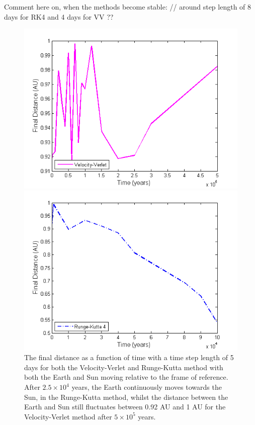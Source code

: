 Comment here on, when the methods become stable:
//
around step length of 8 days for RK4 and 4 days for VV ?? 

\begin{figure}[H]
\centering
\begin{minipage}{.5\textwidth}
  \centering
  \includegraphics[width=1\linewidth]{Figures/test_distance_time_VV.png}
\end{minipage}%
\begin{minipage}{.5\textwidth}
  \centering
  \includegraphics[width=1\linewidth]{Figures/test_distance_time_RK4.png}
\end{minipage}
\caption{
The final distance as a function of time with a time step length of 5 days for both the Velocity-Verlet and Runge-Kutta method with both the Earth and Sun moving relative to the frame of reference.
After $2.5\times 10^4$ years, the Earth continuously moves towards the Sun, in the Runge-Kutta method, whilst the distance between the Earth and Sun still fluctuates between 0.92 AU and 1 AU for the Velocity-Verlet method after $5\times 10^5$ years.  
}
\label{fig:SunEarthMarsTest}
\end{figure}


